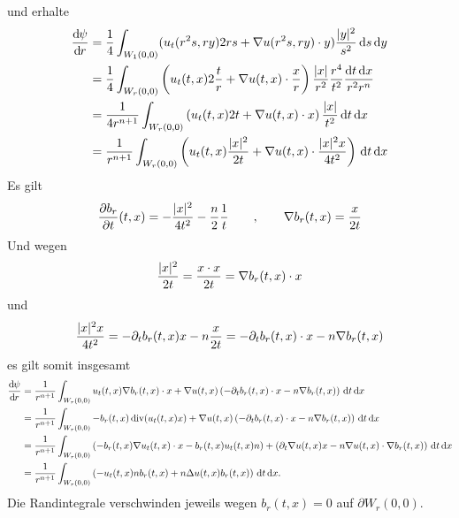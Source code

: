 \begin{beweis}
\begin{enumerate}[(i)]
		und erhalte
		\begin{align*}
			\frac{\mathrm{d}\mkern-1.0mu \psi}{\mathrm{d}\mkern-1.0mu r}  &= \frac{1}{4} \int_{W_1(0,0)}^{} ( u_t(r^2s,ry)2rs +  \nabla u(r^2s,ry) \cdot y) \frac{\lvert y\rvert^2}{s^2} \,\mathrm{d}s \,\mathrm{d}y \\
			&= \frac{1}{4} \int_{W_r(0,0)}^{} \left(u_t(t,x)2 \frac{t}{r} + 
			\nabla u(t,x) \cdot \frac{x}{r} \right) \frac{\lvert x\rvert}{r^2} \frac{r^4}{t^2} \frac{\mathrm{d}t \, \mathrm{d}x}{r^2r^n}  \\
			&= \frac{1}{4r^{n+1}} \int_{W_r(0,0)}^{} \left( u_t(t,x)2t +  \nabla u(t,x) \cdot x \right) \frac{\lvert x\rvert}{t^2} \,\mathrm{d}t \,\mathrm{d}x \\
			&= \frac{1}{r^{n+1}} \int_{W_r(0,0)}^{} \left( u_t(t,x) \frac{\lvert x\rvert^2}{2t}
			+  \nabla u(t,x) \cdot \frac{\lvert x\rvert^2 x}{4t^2} \right) \,\mathrm{d}t  \, \mathrm{d}x
		\end{align*}
		Es gilt
		\begin{align*}
			\frac{{\partial b_r}}{{\partial t}} (t,x) = - \frac{\lvert x\rvert^2}{4t^2} - \frac{n}{2} \frac{1}{t} \qquad , \qquad  \nabla b_r(t,x) = \frac{x}{2t}
		\end{align*}
		Und wegen \[
			\frac{\lvert x\rvert^2}{2t} = \frac{x \cdot x}{2t} =  \nabla b_r(t,x) \cdot x
		\]
		und 
		\[
			\frac{\lvert x\rvert^2 x}{4t^2} = - \partial_tb_r(t,x)x -n \frac{x}{2t} = - \partial_t b_r(t,x) \cdot x - n  \nabla b_r(t,x)
		\]
		es gilt somit insgesamt 
		\begin{align*}
			\frac{\mathrm{d}\mkern-1.0mu \psi}{\mathrm{d}\mkern-1.0mu r}  &= \frac{1}{r^{n+1}} \int_{W_r(0,0)}^{} u_t(t,x)  \nabla b_r(t,x) \cdot x 
			+  \nabla u(t,x) \left( - \partial_t b_r(t,x) \cdot x - n  \nabla b_r(t,x) \right) \,\mathrm{d}t \,\mathrm{d}x \\
			&= \frac{1}{r^{n+1}} \int_{W_r(0,0)}^{}- b_r(t,x) \operatorname{div}(u_t(t,x)x) 
			+  \nabla u(t,x) \left( - \partial_t b_r(t,x) \cdot x - n  \nabla b_r(t,x) \right) \,\mathrm{d}t \,\mathrm{d}x \\
			&= \frac{1}{r^{n+1}} \int_{W_r(0,0)}^{} \left( -b_r(t,x)  \nabla u_t(t,x) \cdot x - b_r(t,x)u_t(t,x)n \right)
			+ \left( \partial_t  \nabla u(t,x) x - n  \nabla u(t,x) \cdot  \nabla b_r(t,x) \right) \,\mathrm{d}t \,\mathrm{d}x \\
			&= \frac{1}{r^{n+1}} \int_{W_r(0,0)}^{} \left( - u_t(t,x)n b_r(t,x) + n \Delta u(t,x) b_r(t,x) \right) \,\mathrm{d}t \,\mathrm{d}x.
		\end{align*}
		Die Randintegrale verschwinden jeweils wegen $b_r(t,x) = 0$ auf $\partial W_r(0,0)$.
		
	\end{enumerate}
\end{beweis}